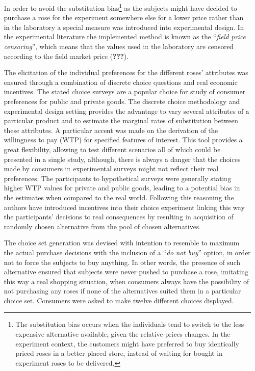 \documentclass[11pt,]{article}
\let\rmarkdownfootnote\footnote%
\def\footnote{\protect\rmarkdownfootnote}
\begin{document}
In order to avoid the substitution bias\footnote{The substitution bias
  occurs when the individuals tend to switch to the less expensive
  alternative available, given the relative prices changes. In the
  experiment context, the customers might have preferred to buy
  identically priced roses in a better placed store, instead of waiting
  for bought in experiment roses to be delivered.} as the subjects might
have decided to purchase a rose for the experiment somewhere else for a
lower price rather than in the laboratory a special measure was
introduced into experimental design. In the experimental literature the
implemented method is known as the ``\emph{field price censoring}'',
which means that the values used in the laboratory are censored
according to the field market price ({\textbf{???}}).

The elicitation of the individual preferences for the different roses'
attributes was ensured through a combination of discrete choice
questions and real economic incentives. The stated choice surveys are a
popular choice for study of consumer preferences for public and private
goods. The discrete choice methodology and experimental design setting
provides the advantage to vary several attributes of a particular
product and to estimate the marginal rates of substitution between these
attributes. A particular accent was made on the derivation of the
willingness to pay (WTP) for specified features of interest. This tool
provides a great flexibility, allowing to test different scenarios all
of which could be presented in a single study, although, there is always
a danger that the choices made by consumers in experimental surveys
might not reflect their real preferences. The participants to
hypothetical surveys were generally stating higher WTP values for
private and public goods, leading to a potential bias in the estimates
when compared to the real world. Following this reasoning the authors
have introduced incentives into their choice experiment linking this way
the participants' decisions to real consequences by resulting in
acquisition of randomly chosen alternative from the pool of chosen
alternatives.

The choice set generation was devised with intention to resemble to
maximum the actual purchase decisions with the inclusion of a ``\emph{do
not buy}'' option, in order not to force the subjects to buy anything.
In other words, the presence of such alternative ensured that subjects
were never pushed to purchase a rose, imitating this way a real shopping
situation, when consumers always have the possibility of not purchasing
any roses if none of the alternatives suited them in a particular choice
set. Consumers were asked to make twelve different choices displayed.
\end{document}
